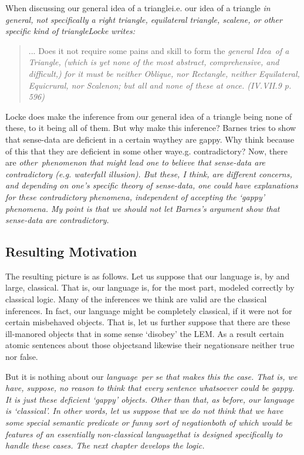 When discussing our general idea of a triangle\textemdash i.e. our idea of a triangle \em in general\em, not specifically a right triangle, equilateral triangle, scalene, or other specific kind of triangle\textemdash Locke writes:

\begin{quote}
... Does it not require some pains and skill to form the \em general Idea\em\ of a \em Triangle\em, (which is yet none of the most abstract, comprehensive, and difficult,) for it must be neither Oblique, nor Rectangle, neither Equilateral, Equicrural, nor Scalenon; but all and none of these at once. (IV.VII.9 p. 596)
\end{quote}
Locke does make the inference from our general idea of a triangle being none of these, to it being all of them. But why make this inference? Barnes tries to show that sense-data are deficient in a certain way\textemdash they are gappy. Why think because of this that they are deficient in some other way\textemdash e.g. contradictory? Now, there are \em other\em\ phenomenon that might lead one to believe that sense-data are contradictory (e.g. waterfall illusion). But these, I think, are different concerns, and depending on one's specific theory of sense-data, one could have explanations for these contradictory phenomena, independent of accepting the `gappy' phenomena. My point is that we should not let Barnes's argument show that sense-data are contradictory.

\subsection{Resulting Motivation}

The resulting picture is as follows. Let us suppose that our language is, by and large, classical. That is, our language is, for the most part, modeled correctly by classical logic. Many of the inferences we think are valid are the classical inferences. In fact, our language might be completely classical, if it were not for certain misbehaved objects. That is, let us further suppose that there are these ill-manored objects that in some sense `disobey' the LEM. As a result certain atomic sentences about those objects\textemdash and likewise their negations\textemdash are neither true nor false.

But it is nothing about our \em language\em\ per se that makes this the case. That is, we have, suppose, no reason to think that every sentence  whatsoever could be gappy. It is just these deficient `gappy' objects. Other than that, as before, our language is `classical'. In other words, let us suppose that we do not think that we have some special semantic predicate or funny sort of negation\textemdash both of which would be features of an essentially non-classical \em language\em\textemdash that is designed specifically to handle these cases. The next chapter develops the logic.

%
%
%


